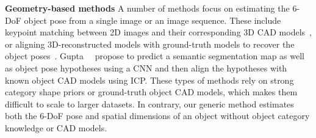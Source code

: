 \documentclass[10pt,twocolumn,letterpaper]{article}
\begin{document}
\textbf{Geometry-based methods} A number of methods focus on estimating the 6-DoF object pose from a single image or an image sequence. These include keypoint matching between 2D images and their corresponding 3D CAD models~\cite{aubry2014seeing, collet2011moped,zhu2014single}, or aligning 3D-reconstructed models with ground-truth models to recover the object poses~\cite{rothganger20063d,ferrari2006simultaneous}. Gupta~\etal~\cite{gupta2015aligning} propose to predict a semantic segmentation map as well as object pose hypotheses using a CNN and then align the hypotheses with known object CAD models using ICP. These types of methods rely on strong category shape priors or ground-truth object CAD models, which makes them difficult to scale to larger datasets. In contrary, our generic method estimates both the 6-DoF pose and spatial dimensions of an object without object category knowledge or CAD models.
\end{document}

